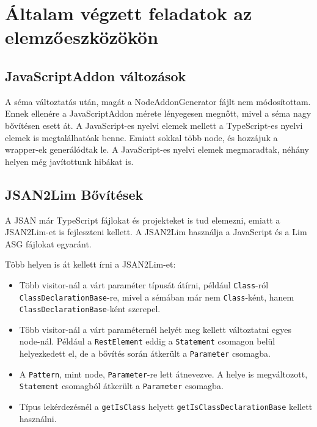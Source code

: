 \chapter{Általam végzett feladatok az elemzőeszközökön}\label{chap:altalam_valtoztatott_programok}

\section{JavaScriptAddon változások}
A séma változtatás után, magát a NodeAddonGenerator fájlt nem módosítottam.
Ennek ellenére a JavaScriptAddon mérete lényegesen megnőtt, mivel a séma nagy bővítésen esett át.
A JavaScript-es nyelvi elemek mellett a TypeScript-es nyelvi elemek is megtalálhatóak benne.
Emiatt sokkal több node, és hozzájuk a wrapper-ek generálódtak le.
A JavaScript-es nyelvi elemek megmaradtak, néhány helyen még javítottunk hibákat is.

\section{JSAN2Lim Bővítések}
A JSAN már TypeScript fájlokat és projekteket is tud elemezni, emiatt a JSAN2Lim-et is fejleszteni kellett.
A JSAN2Lim használja a JavaScript és a Lim ASG fájlokat egyaránt.

Több helyen is át kellett írni a JSAN2Lim-et:
\begin{itemize}
      \item Több visitor-nál a várt paraméter típusát átírni, például \texttt{Class}-ról \texttt{ClassDeclarationBase}-re,
      mivel a sémában már nem \texttt{Class}-ként, hanem \texttt{ClassDeclarationBase}-ként szerepel.
      \item Több visitor-nál a várt paraméternél helyét meg kellett változtatni egyes node-nál.
      Például a \texttt{RestElement} eddig a \texttt{Statement} csomagon belül helyezkedett el, de a bővítés során átkerült a \texttt{Parameter} csomagba.
      \item A \texttt{Pattern}, mint node, \texttt{Parameter}-re lett átnevezve. A helye is megváltozott, \texttt{Statement} csomagból átkerült a \texttt{Parameter} csomagba.
      \item Típus lekérdezésnél a \texttt{getIsClass} helyett \texttt{getIsClassDeclarationBase} kellett használni.
\end{itemize}

